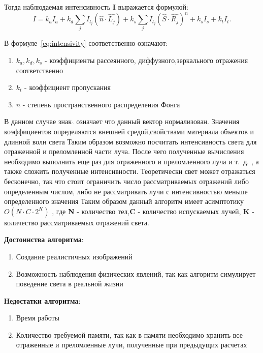 Тогда наблюдаемая интенсивность \textbf{I} выражается формулой:
\begin{equation} 
	I = k_aI_a + k_d \sum_{j} I_{l_j}(\hat{n} \cdot \hat{L_j}) + k_s \sum_{j} I_{l_j}(\hat{S} \cdot \hat{R_j})^n + k_sI_s + k_tI_t.
	\label{eq:intensivity}
\end{equation}

В формуле~\ref{eq:intensivity} соответственно означают:
\begin{enumerate}
	\item $k_a,k_d,k_s$ - коэффициенты рассеянного, диффузного,зеркального отражения соответственно
	\item $k_t$ - коэффициент пропускания
	\item $n$ - степень пространственного распределения Фонга
\end{enumerate}
В данном случае знак $ \hat{} $  означает что данный вектор нормализован.
Значения коэффициентов определяются внешней средой,свойствами материала объектов и длинной волн света
Таким образом возможно посчитать интенсивность света для отраженной и преломленной части луча.
После чего полученные вычисления необходимо выполнить еще раз для отраженного и преломленного луча и т.~д.
, а также сложить полученные интенсивности.
Теоретически свет может отражаться бесконечно, так что стоит ограничить число рассматриваемых отражений либо определенным числом,
либо не рассматривать лучи с интенсивностью меньше определенного значения
Таким образом данный алгоритм имеет асимптотику $O(N \cdot C \cdot 2^{K})$ , где \textbf{N} - количество тел,\textbf{C} - количество испускаемых лучей,
\textbf{K} - количество рассматриваемых отражений света. \cite{Rodgers}



\textbf{Достоинства алгоритма}:
\begin{enumerate}
	\item Создание реалистичных изображений \cite{Rodgers,modern_ray_tracing,SSR}
	\item Возможность наблюдения физических явлений, так как алгоритм симулирует поведение света в реальной жизни \cite{Rodgers,modern_ray_tracing,SSR}
\end{enumerate}


\textbf{Недостатки алгоритма}:
\begin{enumerate}
	\item Время работы \cite{Rodgers,modern_ray_tracing,SSR}
	\item Количество требуемой памяти, так как в памяти необходимо хранить все отраженные и преломленные лучи, полученные при предыдущих расчетах \cite{Rodgers,modern_ray_tracing,SSR}
\end{enumerate}


